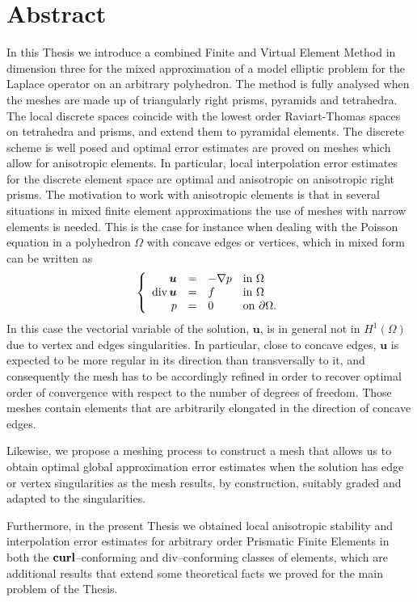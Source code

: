 \section*{Abstract}
In this Thesis we introduce a combined Finite and Virtual Element Method in dimension three
for the mixed approximation of a 
model elliptic problem for the Laplace operator on an 
arbitrary polyhedron. 
The 
method is fully analysed when the meshes are made up of triangularly
right prisms, pyramids and tetrahedra. The local discrete 
spaces coincide with the lowest order Raviart-Thomas 
spaces on tetrahedra and prisms, and 
extend them to pyramidal elements. The discrete scheme 
is well posed and optimal error estimates are proved on meshes which 
allow for anisotropic elements. In particular, local 
interpolation error estimates for the discrete element space are 
optimal and anisotropic on anisotropic right prisms.
The motivation to work with anisotropic elements is that 
in several situations in mixed finite element approximations the use of meshes 
with narrow elements is needed. 
This is the case for instance when dealing with the Poisson equation 
in a polyhedron $\Omega$ with concave edges or vertices, which in mixed form
can be written as
\begin{equation*}\label{mf} 
\left\{\begin{array}{rcll}
\boldsymbol{u}&=&-\nabla p& \mbox{in }\Omega\\
\mbox{div\,}\boldsymbol{u}&=&f& \mbox{in }\Omega\\
p&=&0&\mbox{on }\partial\Omega.\end{array}\right.
\end{equation*}
In this case the vectorial variable of the solution, $\boldsymbol{u}$, is in 
general not in $H^1(\Omega)$ due to vertex and edges 
singularities. In particular, close to concave edges, 
$\boldsymbol{u}$ is expected to be more regular in its direction than transversally 
to it, and consequently the mesh has to be accordingly refined in order to 
recover optimal order of convergence with respect to the number of degrees of 
freedom. Those meshes contain elements that are arbitrarily elongated
in the direction of concave edges.

Likewise, we propose a meshing process to construct a mesh that
allows us to  obtain optimal global 
approximation error estimates when the 
solution has edge or vertex singularities as the mesh results, by construction,
suitably graded and adapted to the singularities.

Furthermore, in the present Thesis we obtained
local anisotropic stability
and interpolation error estimates for arbitrary order Prismatic
Finite Elements in both
the $\textbf{curl}$--conforming and div--conforming classes of elements, which are 
additional results that extend some theoretical facts we proved for
the main problem of the Thesis.

